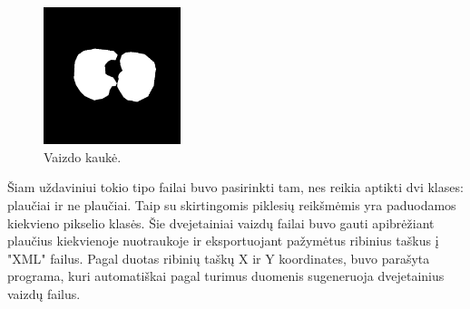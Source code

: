 \documentclass{VUMIFInfKursinis}
\begin{document}
\begin{figure}[ht]
  \includegraphics[width=4cm,height=4cm,keepaspectratio]{mask.png}
  \caption{Vaizdo kaukė.}
  \label{fig:kaukė1}
\end{figure}

\par
Šiam uždaviniui tokio tipo failai buvo pasirinkti tam, nes reikia aptikti dvi klases:
plaučiai ir ne plaučiai. Taip su skirtingomis piklesių reikšmėmis yra paduodamos kiekvieno
pikselio klasės. Šie dvejetainiai vaizdų failai buvo gauti apibrėžiant plaučius kiekvienoje
nuotraukoje ir eksportuojant pažymėtus ribinius taškus į "XML" failus. Pagal duotas ribinių
taškų X ir Y koordinates, buvo parašyta programa, kuri automatiškai pagal turimus
duomenis sugeneruoja dvejetainius vaizdų failus.
\par








\end{document}
